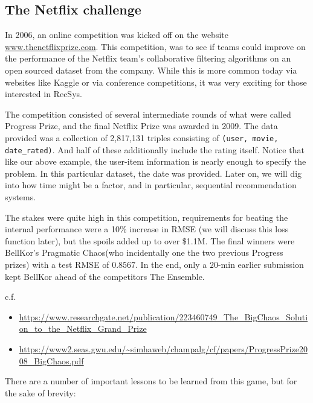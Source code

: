 \subsection{The Netflix challenge}

In 2006, an online competition was kicked off on the website \url{www.thenetflixprize.com}. This competition, was to see if teams could improve on the performance of the Netflix team's collaborative filtering algorithms on an open sourced dataset from the company. While this is more common today via websites like Kaggle or via conference competitions, it was very exciting for those interested in RecSys.

The competition consisted of several intermediate rounds of what were called Progress Prize, and the final Netflix Prize was awarded in 2009. The data provided was a collection of 2,817,131 triples consisting of \lstinline{(user, movie, date_rated)}. And half of these additionally include the rating itself. Notice that like our above example, the user-item information is nearly enough to specify the problem. In this particular dataset, the date was provided. Later on, we will dig into how time might be a factor, and in particular, sequential recommendation systems. 

The stakes were quite high in this competition, requirements for beating the internal performance were a 10\% increase in RMSE (we will discuss this loss function later), but the spoils added up to over \$1.1M. The final winners were BellKor's Pragmatic Chaos(who incidentally one the two previous Progress prizes) with a test RMSE of $0.8567$. In the end, only a $20$-min earlier submission kept BellKor ahead of the competitors The Ensemble. 

c.f. 
\begin{itemize}
\item \url{https://www.researchgate.net/publication/223460749_The_BigChaos_Solution_to_the_Netflix_Grand_Prize}

\item \url{https://www2.seas.gwu.edu/~simhaweb/champalg/cf/papers/ProgressPrize2008_BigChaos.pdf}
\end{itemize}
There are a number of important lessons to be learned from this game, but for the sake of brevity:

